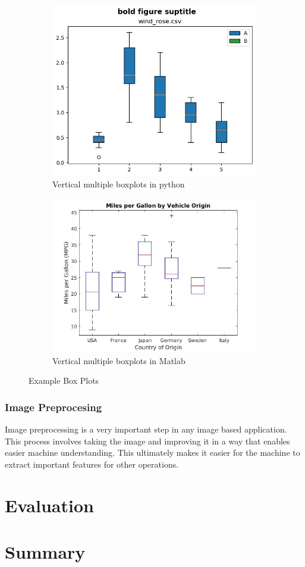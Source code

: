 \documentclass[12pt, a4paper,oneside]{report}
\begin{document}
\begin{figure}
	\begin{subfigure}{.5\textwidth}
		\centering
		\includegraphics[width=.8\linewidth]{box1}
		\caption{Vertical multiple boxplots in python}
		\label{fig:sfig3}
	\end{subfigure}%
	\begin{subfigure}{.5\textwidth}
		\centering
		\includegraphics[width=.8\linewidth]{box2}
		\caption{Vertical multiple boxplots in Matlab}
		\label{fig:sfig3}
	\end{subfigure}
	\caption{Example Box Plots}
	\label{fig:figbox}
\end{figure}




\subsection{Image Preprocesing}
Image preprocessing is a very important step in any image based application. This process involves taking the image and improving it in a way that enables easier machine understanding. This ultimately makes it easier for the machine to extract important features for other operations. 

\chapter{Evaluation}


\chapter{Summary}



\end{document}
